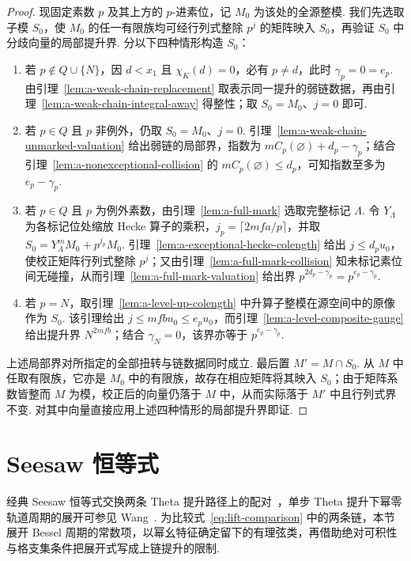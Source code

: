 \begin{proof}
现固定素数 $p$ 及其上方的 $p$-进素位，记 $M_0$ 为该处的全源整模. 我们先选取子模 $S_0$，使 $M_0$ 的任一有限族均可经行列式整除 $p^j$ 的矩阵映入 $S_0$，再验证 $S_0$ 中分歧向量的局部提升界. 分以下四种情形构造 $S_0$：
\begin{enumerate}
\item 若 $p\notin Q\cup\{N\}$，因 $d<x_1$ 且 $\chi_K(d)=0$，必有 $p\ne d$，此时 $\gamma_p=0=e_p$. 由引理~\ref{lem:a-weak-chain-replacement} 取表示同一提升的弱链数据，再由引理~\ref{lem:a-weak-chain-integral-away} 得整性；取 $S_0=M_0$、$j=0$ 即可.
\item 若 $p\in Q$ 且 $p$ 非例外，仍取 $S_0=M_0$、$j=0$. 引理~\ref{lem:a-weak-chain-unmarked-valuation} 给出弱链的局部界，指数为 $mC_p(\varnothing)+d_p-\gamma_p$；结合引理~\ref{lem:a-nonexceptional-collision} 的 $mC_p(\varnothing)\le d_p$，可知指数至多为 $e_p-\gamma_p$.
\item 若 $p\in Q$ 且 $p$ 为例外素数，由引理~\ref{lem:a-full-mark} 选取完整标记 $\Lambda$. 令 $Y_\Lambda$ 为各标记位处缩放 Hecke 算子的乘积，$j_p=\lceil 2mfa/p\rceil$，并取 $S_0=Y_\Lambda^m M_0+p^{j_p}M_0$. 引理~\ref{lem:a-exceptional-hecke-colength} 给出 $j\le d_pu_0$，使校正矩阵行列式整除 $p^j$；又由引理~\ref{lem:a-full-mark-collision} 知未标记素位间无碰撞，从而引理~\ref{lem:a-full-mark-valuation} 给出界 $p^{2d_p-\gamma_p}=p^{e_p-\gamma_p}$.
\item 若 $p=N$，取引理~\ref{lem:a-level-up-colength} 中升算子整模在源空间中的原像作为 $S_0$. 该引理给出 $j\le mfbu_0\le e_pu_0$，而引理~\ref{lem:a-level-composite-gauge} 给出提升界 $N^{2mfb}$；结合 $\gamma_N=0$，该界亦等于 $p^{e_p-\gamma_p}$.
\end{enumerate}
上述局部界对所指定的全部扭转与链数据同时成立. 最后置 $M'=M\cap S_0$. 从 $M$ 中任取有限族，它亦是 $M_0$ 中的有限族，故存在相应矩阵将其映入 $S_0$；由于矩阵系数皆整而 $M$ 为模，校正后的向量仍落于 $M$ 中，从而实际落于 $M'$ 中且行列式界不变. 对其中向量直接应用上述四种情形的局部提升界即证.
\end{proof}

\section{Seesaw 恒等式}
\label{sec:a-seesaw}

经典 Seesaw 恒等式交换两条 Theta 提升路径上的配对~\cite{Kudla1984}，单步 Theta 提升下幂零轨道周期的展开可参见 Wang~\cite[定理~4.5]{Wang2025}. 为比较式~\eqref{eq:lift-comparison} 中的两条链，本节展开 Bessel 周期的常数项，以幂幺特征确定留下的有理弦类，再借助绝对可积性与格支集条件把展开式写成上链提升的限制.

